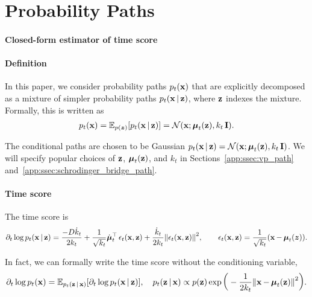 \newpage
\section{Probability Paths}
\label{app:sec:mixture}

\paragraph{Closed-form estimator of time score}

\paragraph{Definition} 
In this paper, we consider probability paths $p_t(\operatorname{\mathbf{x}})$ that are explicitly decomposed as a mixture of simpler probability paths $p_t(\operatorname{\mathbf{x}} | \operatorname{\mathbf{z}})$, where $\operatorname{\mathbf{z}}$ indexes the mixture. Formally, this is written as
\begin{align}
    p_{t}(\operatorname{\mathbf{x}}) 
    =
    \mathbb{E}_{p({\bm{z}})}[p_{t}(\operatorname{\mathbf{x}}|\operatorname{\mathbf{z}})]
    = 
    \mathcal{N}(\operatorname{\mathbf{x}} ; \operatorname{\bm{\mu}}_{t}(\operatorname{\mathbf{z}}),k_{t}\operatorname{\mathbf{I}}).
\end{align}

The conditional paths are chosen to be Gaussian $p_{t}(\operatorname{\mathbf{x}}|\operatorname{\mathbf{z}}) = \mathcal{N}(\operatorname{\mathbf{x}} ; \operatorname{\bm{\mu}}_{t}(\operatorname{\mathbf{z}}),k_{t}\operatorname{\mathbf{I}})$. We will specify popular choices of $\operatorname{\mathbf{z}}$, $\operatorname{\bm{\mu}}_t(\operatorname{\mathbf{z}})$, and $k_t$ in Sections~\ref{app:ssec:vp_path} and~\ref{app:ssec:schrodinger_bridge_path}. 
 

\paragraph{Time score}
The time score is
\begin{align}
    \label{eq:time_score_gaussian_case}
    \partial_t \log p_t(\bx | \bz) 
    =
    \frac{-D \dot{k}_t}{2 k_t}
    +
    \frac{1}{\sqrt{k_{t}}}\dot{\bmu}_t^\top \bepsilon_t(\bx, \bz)
    +
    \frac{\dot{k}_t }{2 k_{t}} 
    \norm{\bepsilon_t(\bx, \bz)}^2
    , \qquad
    \bepsilon_t(\bx, \bz) = \frac{1}{\sqrt{k_t}} (\bx - \bmu_t(\vz)).
\end{align}

In fact, we can formally write the time score without the conditioning variable,
\begin{align}
    \partial_t \log p_t(\operatorname{\mathbf{x}})
    = 
    \mathbb{E}_{p_t(\operatorname{\mathbf{z}} | \operatorname{\mathbf{x}})}[
    \partial_t \log p_t(\operatorname{\mathbf{x}} | \operatorname{\mathbf{z}})
    ]
    , \quad
    p_t(\operatorname{\mathbf{z}} | \operatorname{\mathbf{x}}) 
    \propto 
    p(\operatorname{\mathbf{z}})
    \exp\bigg(
    -\frac{1}{2 k_{t}} \norm{\operatorname{\mathbf{x}}-\operatorname{\bm{\mu}}_{t}(\operatorname{\mathbf{z}})}^{2}
    \bigg).
\end{align}

